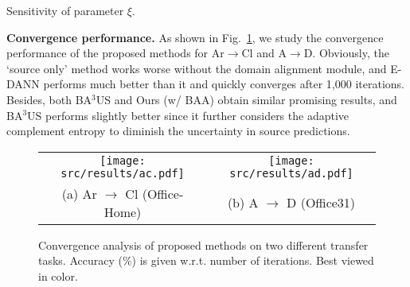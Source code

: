 \documentclass[runningheads]{llncs}
\begin{document}
	\setlength{\tabcolsep}{3.0pt}
	\begin{table}[h]
		\centering
		\begin{minipage}{0.48\linewidth}
			\centering
			\caption{Sensitivity of parameter $\xi$.}
			\label{tab:p1}
		\end{minipage}
		\begin{minipage}{0.48\linewidth}
			\centering
			\caption{Sensitivity of parameter $\beta$.}
			\label{tab:p2}
		\end{minipage}
	\end{table}
	
\textbf{Convergence performance.}
As shown in Fig.~\ref{fig:convergence}, we study the convergence performance of the proposed methods for Ar$\to$Cl and A$\to$D.
Obviously, the `source only' method works worse without the domain alignment module, and E-DANN performs much better than it and quickly converges after 1,000 iterations.
Besides, both BA$^3$US and Ours (w/ BAA) obtain similar promising results, and BA$^3$US performs slightly better since it further considers the adaptive complement entropy to diminish the uncertainty in source predictions.
	
	\begin{figure}[h]
		\centering
		\scriptsize
		\setlength\tabcolsep{0mm}
		\renewcommand\arraystretch{1.0}
		\begin{tabular}{cc}
			\texttt{[image: src/results/ac.pdf]} & 
			\texttt{[image: src/results/ad.pdf]}\\
			(a) Ar $\to$ Cl (Office-Home) & (b) A $\to$ D (Office31)
		\end{tabular}
		\caption{Convergence analysis of proposed methods on two different transfer tasks. Accuracy (\%) is given w.r.t. number of iterations. Best viewed in color.}
		\label{fig:convergence}
	\end{figure}
	
\end{document}
